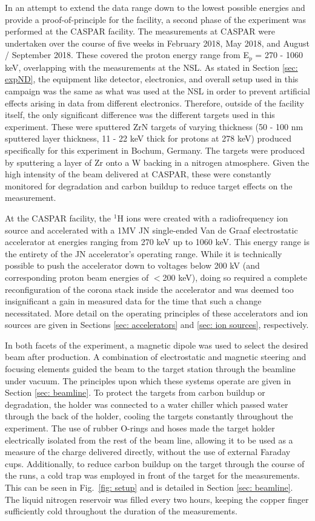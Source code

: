 In an attempt to extend the data range down to the lowest possible energies and provide a proof-of-principle for the facility, a second phase of the experiment was performed at the CASPAR facility. The measurements at CASPAR were undertaken over the course of five weeks in February 2018, May 2018, and August / September 2018. These covered the proton energy range from E$_{p}$ = 270 - 1060 keV, overlapping with the measurements at the NSL. As stated in Section \ref{sec: expND}, the equipment like detector, electronics, and overall setup used in this campaign was the same as what was used at the NSL in order to prevent artificial effects arising in data from different electronics. Therefore, outside of the facility itself, the only significant difference was the different targets used in this experiment. These were sputtered ZrN targets of varying thickness (50 - 100 nm sputtered layer thickness, 11 - 22 keV thick for protons at 278 keV) produced specifically for this experiment in Bochum, Germany. The targets were produced by sputtering a layer of Zr onto a W backing in a nitrogen atmosphere. Given the high intensity of the beam delivered at CASPAR, these were constantly monitored for degradation and carbon buildup to reduce target effects on the measurement. 


At the CASPAR facility, the $^{1}$H ions were created with a radiofrequency ion source and accelerated with a 1MV JN single-ended Van de Graaf electrostatic accelerator at energies ranging from 270 keV up to 1060 keV. This energy range is the entirety of the JN accelerator's operating range. While it is technically possible to push the accelerator down to voltages below 200 kV (and corresponding proton beam energies of $<$200 keV), doing so required a complete reconfiguration of the corona stack inside the accelerator and was deemed too insignificant a gain in measured data for the time that such a change necessitated. More detail on the operating principles of these accelerators and ion sources are given in Sections \ref{sec: accelerators} and \ref{sec: ion sources}, respectively. 


In both facets of the experiment, a magnetic dipole was used to select the desired beam after production. A combination of electrostatic and magnetic steering and focusing elements guided the beam to the target station through the beamline under vacuum. The principles upon which these systems operate are given in Section \ref{sec: beamline}. To protect the targets from carbon buildup or degradation, the holder was connected to a water chiller which passed water through the back of the holder, cooling the targets constantly throughout the experiment. The use of rubber O-rings and hoses made the target holder electrically isolated from the rest of the beam line, allowing it to be used as a measure of the charge delivered directly, without the use of external Faraday cups. Additionally, to reduce carbon buildup on the target through the course of the runs, a cold trap was employed in front of the target for the measurements. This can be seen in Fig.\ \ref{fig: setup} and is detailed in Section \ref{sec: beamline}. The liquid nitrogen reservoir was filled every two hours, keeping the copper finger sufficiently cold throughout the duration of the measurements. 

